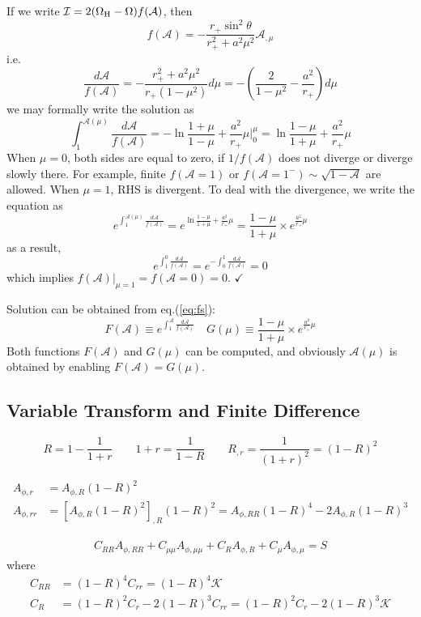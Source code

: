 \documentclass[aps,prd,preprint,groupedaddress]{revtex4-1}
\def\nn{\nonumber}
\def\beq{\begin{equation}}
\def\eeq{\end{equation}}
\def\sst{\sin^2\theta}
\def\Ar{A_{\phi,r}}
\def\Arr{A_{\phi,rr}}
\def\Am{A_{\phi,\mu}}
\def\Amm{A_{\phi,\mu\mu}}
\def\ARR{A_{\phi,RR}}
\def\AR{A_{\phi,R}}
\def\WH{\Omega_{\rm H}}
\begin{document}
If we write $\mathcal I = 2(\WH - \Omega) f(\mathcal A)$, then
\beq
    f(\mathcal A) = -\frac{r_+ \sst}{r_+^2 + a^2\mu^2} \mathcal A_{,\mu}
\eeq
i.e.
\beq
    \frac{d\mathcal A}{f(\mathcal A)} = -\frac{r_+^2 + a^2\mu^2}{r_+ (1-\mu^2)} d\mu
    = -\left(\frac{2}{1-\mu^2} - \frac{a^2}{r_+}\right) d\mu
\eeq
we may formally write the solution as
\beq
\int_1^{\mathcal A(\mu)}\frac{d\mathcal A}{f(\mathcal A)}
 = -\ln \frac{1+\mu}{1-\mu} + \frac{a^2}{r_+}\mu\Big|_0^\mu
 = \ln \frac{1-\mu}{1+\mu} + \frac{a^2}{r_+}\mu
\eeq
When $\mu = 0$, both sides are equal to zero,
if $1/f(\mathcal A)$ does not diverge or diverge slowly there.
For example, finite $f(\mathcal A = 1)$ or $f(\mathcal A = 1^-) \sim \sqrt{1-\mathcal A}$ are allowed.
When $\mu = 1$, RHS is divergent.
To deal with the divergence, we write the equation as
\beq
\label{eq:fs}
e^{\int_1^{\mathcal A(\mu)}\frac{d\mathcal A}{f(\mathcal A)}}
 = e^{\ln \frac{1-\mu}{1+\mu} + \frac{a^2}{r_+}\mu}
 = \frac{1-\mu}{1+\mu} \times e^{\frac{a^2}{r_+}\mu}
\eeq
as a result,
\beq
e^{\int_1^0\frac{d\mathcal A}{f(\mathcal A)}} = e^{-\int_0^1\frac{d\mathcal A}{f(\mathcal A)}} = 0
\eeq
which implies $f(\mathcal A)|_{\mu = 1} = f(\mathcal A = 0) = 0$. $\checkmark$

Solution can be obtained from eq.(\ref{eq:fs}):
\beq
    F(\mathcal A) \equiv e^{\int_1^{\mathcal A}\frac{d\mathcal A}{f(\mathcal A)}} \quad
    G(\mu) \equiv \frac{1-\mu}{1+\mu} \times e^{\frac{a^2}{r_+}\mu}
\eeq
Both functions $F(\mathcal A)$ and $G(\mu) $ can be computed,
and obviously $\mathcal A(\mu)$ is obtained by enabling $F(\mathcal A) = G(\mu)$.

\subsection{Variable Transform and Finite Difference}

\beq
    R = 1-\frac{1}{1+r} \qquad 1+r = \frac{1}{1-R} \qquad R_{,r} = \frac{1}{(1+r)^2} = (1-R)^2
\eeq

\begin{align}
    \Ar &= \AR (1-R)^2 \nn\\
    \Arr&=   [\AR (1-R)^2]_{,R} (1-R)^2 = \ARR (1-R)^4 - 2 \AR (1-R)^3
\end{align}



\begin{align}
    C_{RR} \ARR + C_{\mu\mu} \Amm + C_R \AR + C_\mu \Am = S
\end{align}
where
\begin{align}
    C_{RR} &= (1-R)^4 C_{rr} = (1-R)^4 \mathcal K  \nn \\
    C_{R}  &= (1-R)^2 C_r - 2  (1-R)^3 C_{rr} = (1-R)^2 C_r - 2  (1-R)^3 \mathcal K
\end{align}
\end{document}
